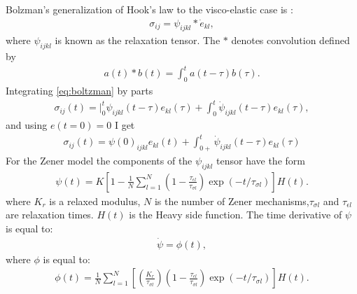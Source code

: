 \documentclass[11pt]{article}
\begin{document}

Bolzman's generalization of Hook's law to the visco-elastic case is
\citep{Hudson1985}:
\begin{eqnarray}
\sigma_{ij} = \psi_{ijkl}*\dot{e}_{kl},
                  \label{eq:boltzman}
\end{eqnarray}where $\psi_{ijkl}$ is known as the relaxation tensor.
The $*$ denotes convolution defined by
\begin{eqnarray}
a(t)*b(t)=\int_0^t a(t-\tau)b(\tau).
\end{eqnarray}
Integrating \eqref{eq:boltzman} by parts
\begin{eqnarray}
\sigma_{ij}(t)=|_0^t \psi_{ijkl}(t-\tau)e_{kl}(\tau) +\int_0^t \dot{\psi}_{ijkl}(t-\tau)e_{kl}(\tau),
\end{eqnarray}
and using $e(t=0)=0$ I get
\begin{eqnarray}
\sigma_{ij}(t)=\psi(0)_{ijkl}e_{kl}(t) +\int_{0+}^t \dot{\psi}_{ijkl}(t-\tau)e_{kl}(\tau)
\end{eqnarray}
For the Zener model the components of the $\psi_{ijkl}$ tensor have the form
\begin{eqnarray}
  \psi(t)=K\left[1-\frac{1}{N}\sum_{l=1}^N 
            (1-\frac{\tau_{\epsilon l}}{\tau_{\sigma l}})\exp(-t/\tau_{\sigma l})\right]H(t).
\end{eqnarray}
%
where $K_r$ is a relaxed modulus, $N$ is the number of Zener mechanisms,$\tau_{\sigma l}$
and $\tau_{\epsilon l}$ are relaxation times. $H(t)$ is the Heavy side function.
The time derivative of $\psi$ is equal to:
\begin{eqnarray}
\dot{\psi} = \phi(t),
\end{eqnarray}
where $\phi$ is equal to:
\begin{eqnarray}
\phi(t)=
  \frac{1}{N}\sum_{l=1}^N\left[\left(\frac{K_r}{\tau_{\sigma l}}\right) 
            \left(1-\frac{\tau_{\epsilon l}}{\tau_{\sigma l}}\right)\exp(-t/\tau_{\sigma l})\right]H(t).
                \label{eq:phi}
\end{eqnarray}
\end{document}
